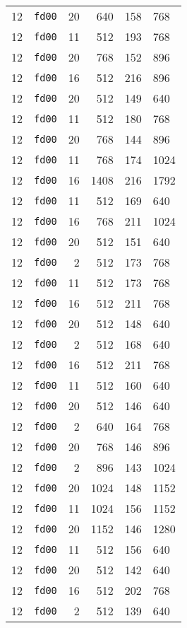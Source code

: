 \documentclass{article}
\begin{document}
\begin{table}[h!]
\begin{tabular}{llrrrl}
    12 & \texttt{fd00} & 20 & 640 & 158 & 768 \\
    12 & \texttt{fd00} & 11 & 512 & 193 & 768 \\
    12 & \texttt{fd00} & 20 & 768 & 152 & 896 \\
    12 & \texttt{fd00} & 16 & 512 & 216 & 896 \\
    12 & \texttt{fd00} & 20 & 512 & 149 & 640 \\
    12 & \texttt{fd00} & 11 & 512 & 180 & 768 \\
    12 & \texttt{fd00} & 20 & 768 & 144 & 896 \\
    12 & \texttt{fd00} & 11 & 768 & 174 & 1024 \\
    12 & \texttt{fd00} & 16 & 1408 & 216 & 1792 \\
    12 & \texttt{fd00} & 11 & 512 & 169 & 640 \\
    12 & \texttt{fd00} & 16 & 768 & 211 & 1024 \\
    12 & \texttt{fd00} & 20 & 512 & 151 & 640 \\
    12 & \texttt{fd00} & 2 & 512 & 173 & 768 \\
    12 & \texttt{fd00} & 11 & 512 & 173 & 768 \\
    12 & \texttt{fd00} & 16 & 512 & 211 & 768 \\
    12 & \texttt{fd00} & 20 & 512 & 148 & 640 \\
    12 & \texttt{fd00} & 2 & 512 & 168 & 640 \\
    12 & \texttt{fd00} & 16 & 512 & 211 & 768 \\
    12 & \texttt{fd00} & 11 & 512 & 160 & 640 \\
    12 & \texttt{fd00} & 20 & 512 & 146 & 640 \\
    12 & \texttt{fd00} & 2 & 640 & 164 & 768 \\
    12 & \texttt{fd00} & 20 & 768 & 146 & 896 \\
    12 & \texttt{fd00} & 2 & 896 & 143 & 1024 \\
    12 & \texttt{fd00} & 20 & 1024 & 148 & 1152 \\
    12 & \texttt{fd00} & 11 & 1024 & 156 & 1152 \\
    12 & \texttt{fd00} & 20 & 1152 & 146 & 1280 \\
    12 & \texttt{fd00} & 11 & 512 & 156 & 640 \\
    12 & \texttt{fd00} & 20 & 512 & 142 & 640 \\
    12 & \texttt{fd00} & 16 & 512 & 202 & 768 \\
    12 & \texttt{fd00} & 2 & 512 & 139 & 640 \\

\end{tabular}
\end{table}
\end{document}
